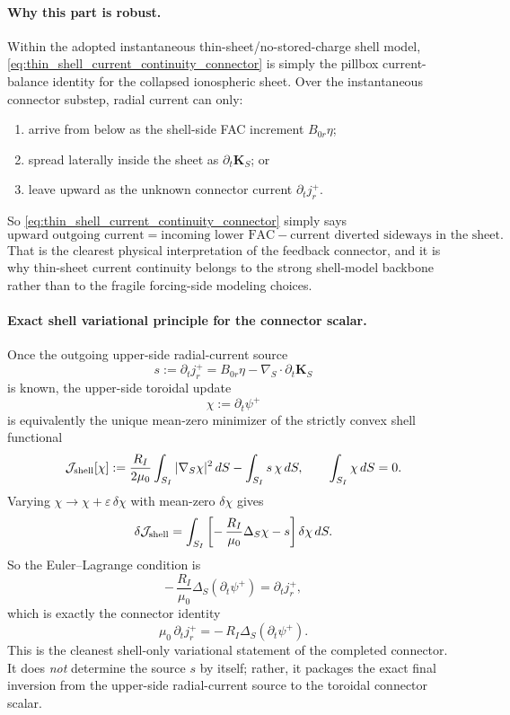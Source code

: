 \documentclass[11pt,a4paper]{article}
\begin{document}
\paragraph{Why this part is robust.}
Within the adopted instantaneous thin-sheet/no-stored-charge shell model,
\eqref{eq:thin_shell_current_continuity_connector} is simply the pillbox
current-balance identity for the collapsed ionospheric sheet. Over the
instantaneous connector substep, radial current can only:
\begin{enumerate}
\item arrive from below as the shell-side FAC increment \(B_{0r}\eta\);
\item spread laterally inside the sheet as \(\partial_t\mathbf K_S\); or
\item leave upward as the unknown connector current \(\partial_t j_r^+\).
\end{enumerate}
So \eqref{eq:thin_shell_current_continuity_connector} simply says
\[
\text{upward outgoing current}
=
\text{incoming lower FAC}
-
\text{current diverted sideways in the sheet}.
\]
That is the clearest physical interpretation of the feedback connector, and it
is why thin-sheet current continuity belongs to the strong shell-model
backbone rather than to the fragile forcing-side modeling choices.

\paragraph{Exact shell variational principle for the connector scalar.}
Once the outgoing upper-side radial-current source
\[
s := \partial_t j_r^+
=
B_{0r}\eta - \nabla_S\cdot \partial_t\mathbf K_S
\]
is known, the upper-side toroidal update
\[
\chi := \partial_t\psi^+
\]
is equivalently the unique mean-zero minimizer of the strictly convex shell
functional
\begin{equation}
\mathcal J_{\rm shell}[\chi]
:=
\frac{R_I}{2\mu_0}
\int_{S_I} |\nabla_S \chi|^2\,dS
-\int_{S_I} s\,\chi\,dS,
\qquad
\int_{S_I}\chi\,dS = 0.
\label{eq:shell_variational_connector}
\end{equation}
Varying \(\chi\to \chi+\varepsilon\,\delta\chi\) with mean-zero
\(\delta\chi\) gives
\[
\delta \mathcal J_{\rm shell}
=
\int_{S_I}
\left[
-\,\frac{R_I}{\mu_0}\Delta_S\chi - s
\right]\delta\chi\,dS.
\]
So the Euler--Lagrange condition is
\begin{equation}
-\,\frac{R_I}{\mu_0}\Delta_S(\partial_t\psi^+)
=
\partial_t j_r^+,
\label{eq:shell_variational_connector_EL}
\end{equation}
which is exactly the connector identity
\[
\mu_0\,\partial_t j_r^+ = -\,R_I\Delta_S(\partial_t\psi^+).
\]
This is the cleanest shell-only variational statement of the completed
connector. It does \emph{not} determine the source \(s\) by itself; rather, it
packages the exact final inversion from the upper-side radial-current source to
the toroidal connector scalar.
\end{document}
